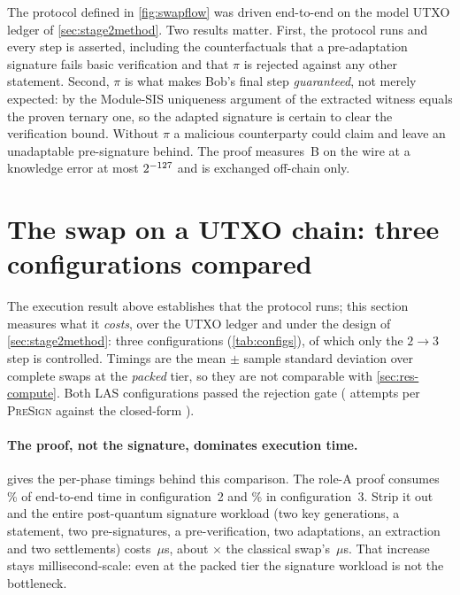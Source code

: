 \enlargethispage{2\baselineskip}
The protocol defined in \cref{fig:swapflow} was driven end-to-end on the model UTXO
ledger of \cref{sec:stage2method}. Two results matter. First, the protocol runs and every
step is asserted, including the counterfactuals that a pre-adaptation signature fails
basic verification and that $\pi$ is rejected against any other statement. Second, $\pi$
is what makes Bob's final step \emph{guaranteed}, not merely expected: by the
Module-SIS uniqueness argument of \cite{esgin2020post} the extracted witness equals the
proven ternary one, so the adapted signature is certain to clear the verification bound.
Without $\pi$ a malicious counterparty could claim and leave an unadaptable
pre-signature behind. The proof measures \cmpProofTo\,B on the wire at a knowledge error
at most $2^{-127}$ and is exchanged off-chain only.

\section{The swap on a UTXO chain: three configurations compared}
\label{sec:res-stage2}

The execution result above establishes that the protocol runs; this section measures what
it \emph{costs}, over the UTXO ledger and under the design of \cref{sec:stage2method}:
three configurations (\cref{tab:configs}), of which only the $2\to3$ step is controlled.
Timings are the mean $\pm$ sample standard deviation over \stageTwoRuns{} complete swaps
at the \emph{packed} tier, so they are not comparable with \cref{sec:res-compute}. Both
LAS configurations passed the rejection gate (\cfgTwoRejMeasured{} attempts per
\textsc{PreSign} against the closed-form \cfgTwoRejExpected{}).


\paragraph{The proof, not the signature, dominates execution time.}
 gives the per-phase timings behind this comparison. The
role-A proof consumes \cfgTwoProofPct{}\% of end-to-end time in configuration~2 and
\cfgThreeProofPct{}\% in configuration~3. Strip it out and the entire post-quantum
signature workload (two key generations, a statement, two pre-signatures, a
pre-verification, two adaptations, an extraction and two settlements) costs
\cfgTwoNonProofUs{}\,$\mu$s, about \stageTwoCryptoRatio{}$\times$ the classical swap's
\cfgOneNonProofUs{}\,$\mu$s. That increase stays millisecond-scale: even at the packed
tier the signature workload is not the bottleneck.

